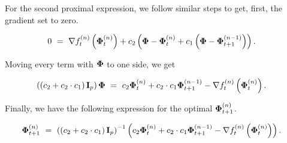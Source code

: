\documentclass{article}
\begin{document}
	For the second proximal expression, we follow similar steps to get, first, the gradient set to zero.
	
	\begin{align}
		0\ &=\ \nabla f_t^{(n)} \left( \mathbf{\Phi}_t^{(n)} \right) + c_2 \left( \mathbf{\Phi} - \mathbf{\Phi}_t^{(n)} + c_1 \left( \mathbf{\Phi} - \mathbf{\Phi}_{t+1}^{(n-1)} \right)  \right) \textnormal{.}
	\end{align}
    
    \noindent Moving every term with $\mathbf{\Phi}$ to one side, we get
    
    \begin{align}
    		\left( \left( c_2 + c_2 \cdot c_1 \right) \mathbf{I}_p \right) \mathbf{\Phi}\ &=\ c_2 \mathbf{\Phi}_t^{(n)} + c_2 \cdot c_1 \mathbf{\Phi}_{t+1}^{(n-1)} - \nabla f_t^{(n)} \left( \mathbf{\Phi}_t^{(n)} \right) \textnormal{.}
    \end{align}
    
    \noindent Finally, we have the following expression for the optimal $\mathbf{\Phi}_{t+1}^{(n)}$.
    
    \begin{align}
    		\mathbf{\Phi}_{t+1}^{(n)}\ &=\ \left( \left( c_2 + c_2 \cdot c_1 \right) \mathbf{I}_p \right)^{-1} \left( c_2 \mathbf{\Phi}_t^{(n)} + c_2 \cdot c_1 \mathbf{\Phi}_{t+1}^{(n-1)} - \nabla f_t^{(n)} \left( \mathbf{\Phi}_t^{(n)} \right) \right) \textnormal{.}
    \end{align}
	
	
\end{document}
